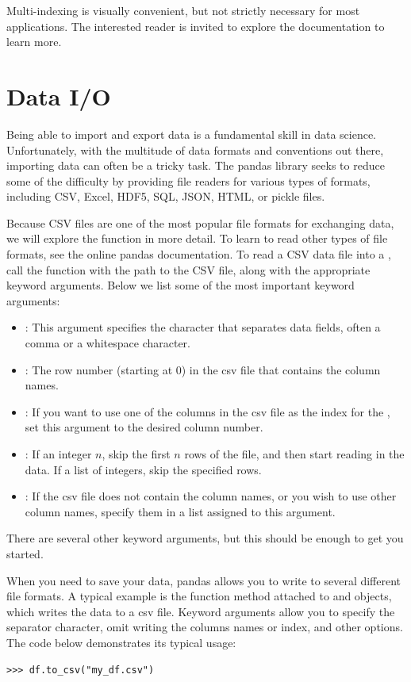 Multi-indexing is visually convenient, but not strictly necessary for most applications.
The interested reader is invited to explore the documentation to learn more.

\section*{Data I/O}
Being able to import and export data is a fundamental skill in data science. Unfortunately, with the
multitude of data formats and conventions out there, importing data can often be a tricky task. The pandas library
seeks to reduce some of the difficulty by providing file readers for various types of formats, including
CSV, Excel, HDF5, SQL, JSON, HTML, or pickle files.

Because CSV files are one of the most popular file formats for exchanging data, we will explore the
 function in more detail. To learn to read other types of file formats, see the online pandas documentation.
To read a CSV data file into a , call the  function with the path to the CSV file,
along with the appropriate keyword arguments. Below we list some of the most important keyword arguments:
\begin{itemize}
\item {}:
This argument specifies the character that separates data fields, often a comma or a whitespace character.

\item {}:
The row number (starting at 0) in the csv file that contains the column names.

\item {}:
If you want to use one of the columns in the csv file as the index for the ,
set this argument to the desired column number.

\item {}:
If an integer $n$, skip the first $n$ rows of the file, and then start reading in the data. If a list
of integers, skip the specified rows.

\item {}:
If the csv file does not contain the column names, or you wish to use other column names, specify them
in a list assigned to this argument.

\end{itemize}
There are several other keyword arguments, but this should be enough to get you started.

When you need to save your data, pandas allows you to write to several different file formats.
A typical example is the  function method attached to  and  objects,
which writes the data to a csv file.
Keyword arguments allow you to specify the separator character, omit writing the columns names or index,
and other options. The code below demonstrates its typical usage:
\begin{lstlisting}
>>> df.to_csv("my_df.csv")
\end{lstlisting}

